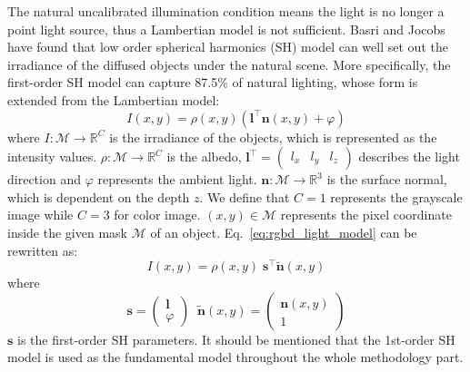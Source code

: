 The natural uncalibrated illumination condition means the light is no longer a point light source, thus a Lambertian model is not sufficient. 
Basri and Jocobs~\cite{basri2003lambertian} have found that low order spherical harmonics (SH) model can well set out the irradiance of the diffused objects under the natural scene.
More specifically, the first-order SH model can capture 87.5\% of natural lighting, whose form is extended from the Lambertian model:
\begin{equation}\label{eq:rgbd_light_model}
I(x,y) = \rho(x,y)(\mathbf{l}^\top \mathbf{n}(x,y) + \varphi)
\end{equation}
where $I : \mathcal{M}\rightarrow \mathbb{R}^C$ is the irradiance of the objects, which is represented as the intensity values. 
$\rho : \mathcal{M}\rightarrow \mathbb{R}^C$ is the albedo, $\mathbf{l}^\top = \begin{pmatrix} l_x & l_y & l_z \end{pmatrix}$ describes the light direction and $\varphi$ represents the ambient light.
$\mathbf{n} : \mathcal{M}\rightarrow \mathbb{R}^3$ is the surface normal, which is dependent on the depth $z$.
We define that $C = 1$ represents the grayscale image while $C = 3$ for color image. 
$(x,y) \in \mathcal{M}$ represents the pixel coordinate inside the given mask $\mathcal{M}$ of an object.
Eq.~\ref{eq:rgbd_light_model} can be rewritten as:
\begin{equation}\label{eq:rgbd_light_model2}
I(x,y) = \rho(x,y) \; \mathbf{s}^\top \tilde{\mathbf{n}}(x,y)
\end{equation}
where
\begin{equation}
\mathbf{s} = \begin{pmatrix}\mathbf{l} \\ \varphi \end{pmatrix} 
 \; \; 
\tilde{\mathbf{n}}(x,y) = \begin{pmatrix}\mathbf{n}(x,y) \\ 1\end{pmatrix}
\end{equation}
$\mathbf{s}$ is the first-order SH parameters. It should be mentioned that the 1st-order SH model is used as the fundamental model throughout the whole methodology part.

